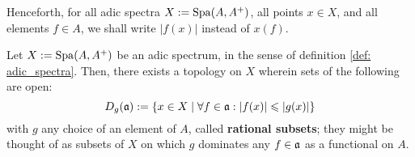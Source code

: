             \begin{convention}
                Henceforth, for all adic spectra $X := \mathrm{Spa}(A, A^+)$, all points $x \in X$, and all elements $f \in A$, we shall write $|f(x)|$ instead of $x(f)$.
            \end{convention}
            \begin{proposition} \label{prop: the_rational_topology}
                Let $X := \mathrm{Spa}(A, A^+)$ be an adic spectrum, in the sense of definition \ref{def: adic_spectra}. Then, there exists a topology on $X$ wherein sets of the following are open:
                    $$D_g(\mathfrak{a}) := \{x \in X \mid \forall f \in \mathfrak{a}: |f(x)| \leqslant |g(x)|\}$$
                with $g$ any choice of an element of $A$, called \textbf{rational subsets}; they might be thought of as subsets of $X$ on which $g$ dominates any $f \in \mathfrak{a}$ as a functional on $A$.
            \end{proposition}
